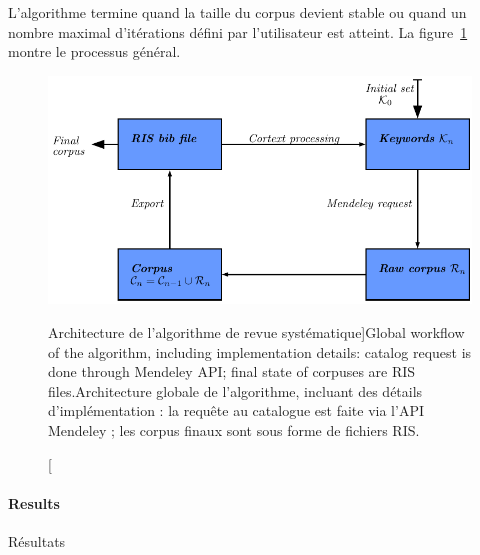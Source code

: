 {L'algorithme termine quand la taille du corpus devient stable ou quand un nombre maximal d'itérations défini par l'utilisateur est atteint. La figure~\ref{fig:quantepistemo:algo}  montre le processus général.
}


\begin{figure}
\centering
\includegraphics[width=\textwidth]{Figures/QuantitativeEpistemo/schema_algo}
\caption[Systematic review algorithm workflow][Architecture de l'algorithme de revue systématique]{Global workflow of the algorithm, including implementation details: catalog request is done through Mendeley API; final state of corpuses are RIS files.}{Architecture globale de l'algorithme, incluant des détails d'implémentation : la requête au catalogue est faite via l'API Mendeley ; les corpus finaux sont sous forme de fichiers RIS.}
\label{fig:quantepistemo:algo}
\end{figure}



\paragraph{Results}{Résultats}



